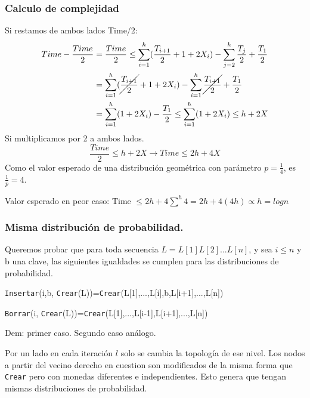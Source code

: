 \documentclass[10pt]{beamer}
\begin{document}
\begin{frame}
\frametitle{Calculo de complejidad}
Si restamos de ambos lados Time/2:
\begin{equation*}
  \begin{split}
  Time - \frac{Time}{2} &= \frac{Time}{2} \leq \sum_{i=1}^h (\frac{T_{i+1}}{2} +1 + 2X_i) -  \sum_{j=2}^h \frac{T_j}{2} + \frac{T_1}{2} \\
                        &=\sum_{i=1}^h (\cancel{\frac{T_{i+1}}{2}}+1 + 2X_i) - \sum_{i=1}^h  \cancel{\frac{T_{i+1}}{2}}  + \frac{T_1}{2}   \\
                          &=  \sum_{i=1}^h (1 + 2X_i) -  \frac{T_1}{2}\leq  \sum_{i=1}^h (1 + 2X_i) \leq h + 2X
  \end{split}
\end{equation*}
Si multiplicamos por 2 a ambos lados.
\pause
\begin{equation*}
  \frac{Time}{2} \leq h + 2X \rightarrow Time \leq 2h + 4X
\end{equation*}
\pause
Como el valor esperado de una distribución geométrica con parámetro $p=\frac{1}{4}$, es $\frac{1}{p}=4$.
\pause
\begin{mdframed}[backgroundcolor=frenchblue!20]
  Valor esperado en peor caso: Time $\leq 2h+ 4\sum^h 4 = 2h+4(4h) \propto h=logn$
\end{mdframed}

\end{frame}



\begin{frame}
\frametitle{Misma distribución de probabilidad.}

Queremos probar que para toda secuencia $L=L[1]L[2]...L[n]$, y sea $i\leq n$ y b una clave,
las siguientes igualdades se cumplen para las distribuciones de probabilidad.

\pause
\begin{centering}
  \texttt{Insertar}(i,b, \texttt{Crear}(L))=\texttt{Crear}(L[1],...,L[i],b,L[i+1],...,L[n])
\end{centering}

\begin{centering}
  \texttt{Borrar}(i, \texttt{Crear}(L))=\texttt{Crear}(L[1],...,L[i-1],L[i+1],...,L[n])
\end{centering}

\pause
Dem: primer caso. Segundo caso análogo.

\pause
Por un lado en cada iteración $l$ solo se cambia la topología de ese nivel.
Los nodos a partir del vecino derecho en cuestion son modificados de la misma forma que \texttt{Crear} pero con
monedas diferentes e independientes.
Esto genera que tengan mismas distribuciones de probabilidad.

\end{frame}
\end{document}
